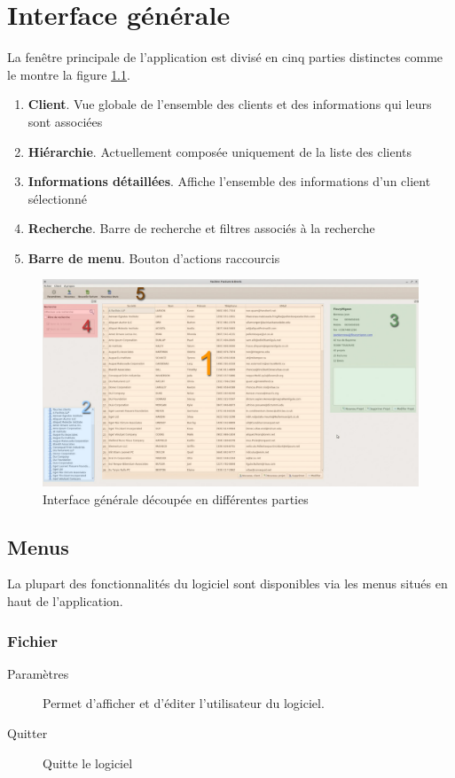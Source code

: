 \chapter{Interface générale}
La fenêtre principale de l'application est divisé en cinq parties distinctes comme le montre la figure \ref{fig:ihm}. 

\begin{enumerate}
	\item \textbf{Client}. Vue globale de l'ensemble des clients et des informations qui leurs sont associées
	\item \textbf{Hiérarchie}. Actuellement composée uniquement de la liste des clients
	\item \textbf{Informations détaillées}. Affiche l'ensemble des informations d’un client sélectionné
	\item \textbf{Recherche}. Barre de recherche et filtres associés à la recherche
	\item \textbf{Barre de menu}. Bouton d’actions raccourcis
\end{enumerate}

\begin{figure}[H]
	\centering
	\includegraphics[width=15cm]{screens/ihm.jpg}
	\caption{Interface générale découpée en différentes parties}
	\label{fig:ihm}
\end{figure}

\section{Menus}
La plupart des fonctionnalités du logiciel sont disponibles via les menus situés en haut de l’application. 

\subsection{Fichier}
	\begin{description}
		\item[Paramètres] Permet d'afficher et d’éditer l’utilisateur du logiciel.
		\item[Quitter] Quitte le logiciel
	\end{description}
